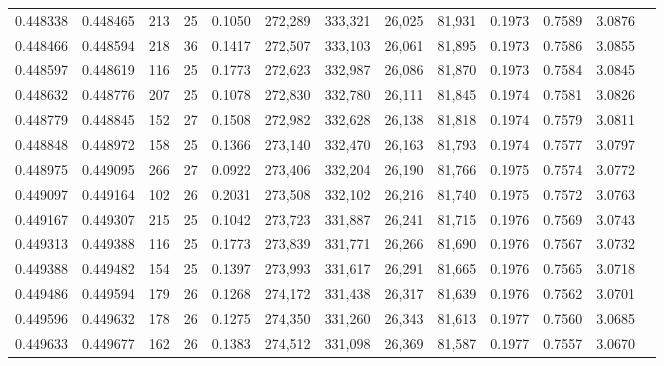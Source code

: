\begin{tabular}{rrrrrrrrrrrrr}
0.448338 & 0.448465 & 213 &  25 &                                     0.1050 & 272,289 & 333,321 &  26,025 &  81,931 & 0.1973 & 0.7589 & 3.0876 \\
0.448466 & 0.448594 & 218 &  36 &                                     0.1417 & 272,507 & 333,103 &  26,061 &  81,895 & 0.1973 & 0.7586 & 3.0855 \\
0.448597 & 0.448619 & 116 &  25 &                                     0.1773 & 272,623 & 332,987 &  26,086 &  81,870 & 0.1973 & 0.7584 & 3.0845 \\
0.448632 & 0.448776 & 207 &  25 &                                     0.1078 & 272,830 & 332,780 &  26,111 &  81,845 & 0.1974 & 0.7581 & 3.0826 \\
0.448779 & 0.448845 & 152 &  27 &                                     0.1508 & 272,982 & 332,628 &  26,138 &  81,818 & 0.1974 & 0.7579 & 3.0811 \\
0.448848 & 0.448972 & 158 &  25 &                                     0.1366 & 273,140 & 332,470 &  26,163 &  81,793 & 0.1974 & 0.7577 & 3.0797 \\
0.448975 & 0.449095 & 266 &  27 &                                     0.0922 & 273,406 & 332,204 &  26,190 &  81,766 & 0.1975 & 0.7574 & 3.0772 \\
0.449097 & 0.449164 & 102 &  26 &                                     0.2031 & 273,508 & 332,102 &  26,216 &  81,740 & 0.1975 & 0.7572 & 3.0763 \\
0.449167 & 0.449307 & 215 &  25 &                                     0.1042 & 273,723 & 331,887 &  26,241 &  81,715 & 0.1976 & 0.7569 & 3.0743 \\
0.449313 & 0.449388 & 116 &  25 &                                     0.1773 & 273,839 & 331,771 &  26,266 &  81,690 & 0.1976 & 0.7567 & 3.0732 \\
0.449388 & 0.449482 & 154 &  25 &                                     0.1397 & 273,993 & 331,617 &  26,291 &  81,665 & 0.1976 & 0.7565 & 3.0718 \\
0.449486 & 0.449594 & 179 &  26 &                                     0.1268 & 274,172 & 331,438 &  26,317 &  81,639 & 0.1976 & 0.7562 & 3.0701 \\
0.449596 & 0.449632 & 178 &  26 &                                     0.1275 & 274,350 & 331,260 &  26,343 &  81,613 & 0.1977 & 0.7560 & 3.0685 \\
0.449633 & 0.449677 & 162 &  26 &                                     0.1383 & 274,512 & 331,098 &  26,369 &  81,587 & 0.1977 & 0.7557 & 3.0670 \\

\end{tabular}
